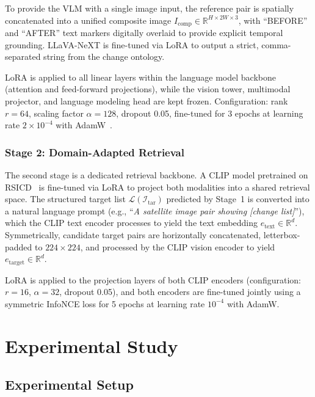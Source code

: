 To provide the VLM with a single image input, the reference
pair is spatially concatenated into a unified composite
image $I_\text{comp} \in \mathbb{R}^{H \times 2W \times 3}$,
with ``BEFORE'' and ``AFTER'' text markers digitally
overlaid to provide explicit temporal grounding. LLaVA-NeXT
is fine-tuned via LoRA to output a strict, comma-separated
string from the change ontology.
 
LoRA is applied to all linear layers within the language
model backbone (attention and feed-forward projections),
while the vision tower, multimodal projector, and language
modeling head are kept frozen. Configuration: rank $r = 64$,
scaling factor $\alpha = 128$, dropout 0.05, fine-tuned for
3 epochs at learning rate $2 \times 10^{-4}$ with
AdamW~\cite{adamw}.
 
\subsubsection{Stage 2: Domain-Adapted Retrieval}
\label{sec:chap7_stage2}
 
The second stage is a dedicated retrieval backbone. A CLIP
model pretrained on RSICD~\cite{lu2017exploring} is
fine-tuned via LoRA to project both modalities into a
shared retrieval space. The structured target list
$\mathcal{L}(\mathcal{I}_\text{tar})$ predicted by Stage~1
is converted into a natural language prompt (e.g., ``\textit{A
satellite image pair showing [change list]}''), which the
CLIP text encoder processes to yield the text embedding
$e_\text{text} \in \mathbb{R}^d$. Symmetrically, candidate
target pairs are horizontally concatenated,
letterbox-padded to $224 \times 224$, and processed by the
CLIP vision encoder to yield $e_\text{target} \in
\mathbb{R}^d$.
 
LoRA is applied to the projection layers of both CLIP
encoders (configuration: $r = 16$, $\alpha = 32$, dropout
0.05), and both encoders are fine-tuned jointly using a
symmetric InfoNCE loss for 5 epochs at learning rate
$10^{-4}$ with AdamW.
 
\section{Experimental Study}
\label{sec:chap7_experiments}
 
\subsection{Experimental Setup}
\label{sec:chap7_setup}
 
